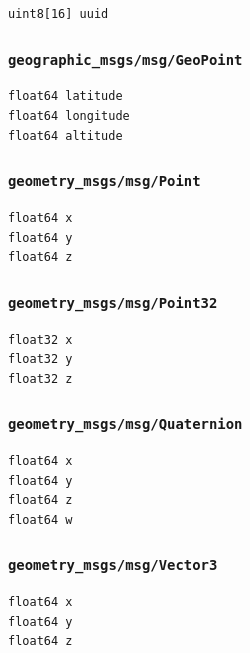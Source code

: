 \documentclass[
]{article}
\begin{document}
\begin{verbatim}
uint8[16] uuid
\end{verbatim}

\subsubsection{\texorpdfstring{\texttt{geographic\_msgs/msg/GeoPoint}}{geographic\_msgs/msg/GeoPoint}}\label{geographic_msgsmsggeopoint}

\begin{verbatim}
float64 latitude
float64 longitude
float64 altitude
\end{verbatim}

\subsubsection{\texorpdfstring{\texttt{geometry\_msgs/msg/Point}}{geometry\_msgs/msg/Point}}\label{geometry_msgsmsgpoint}

\begin{verbatim}
float64 x
float64 y
float64 z
\end{verbatim}

\subsubsection{\texorpdfstring{\texttt{geometry\_msgs/msg/Point32}}{geometry\_msgs/msg/Point32}}\label{geometry_msgsmsgpoint32}

\begin{verbatim}
float32 x
float32 y
float32 z
\end{verbatim}

\subsubsection{\texorpdfstring{\texttt{geometry\_msgs/msg/Quaternion}}{geometry\_msgs/msg/Quaternion}}\label{geometry_msgsmsgquaternion}

\begin{verbatim}
float64 x
float64 y
float64 z
float64 w
\end{verbatim}

\subsubsection{\texorpdfstring{\texttt{geometry\_msgs/msg/Vector3}}{geometry\_msgs/msg/Vector3}}\label{geometry_msgsmsgvector3}

\begin{verbatim}
float64 x
float64 y
float64 z
\end{verbatim}
\end{document}
